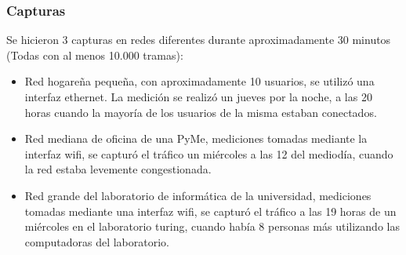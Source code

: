 \subsubsection*{Capturas}
Se hicieron 3 capturas en redes diferentes durante aproximadamente 30 minutos (Todas con al menos 10.000 tramas):
\begin{itemize}
	\item Red hogareña pequeña, con aproximadamente 10 usuarios, se utilizó una interfaz ethernet. La medición se realizó un jueves por la noche, a las 20 horas cuando la mayoría de los usuarios de la misma estaban conectados.
	\item Red mediana de oficina de una PyMe, mediciones tomadas mediante la interfaz wifi, se capturó el tráfico un miércoles a las 12 del mediodía, cuando la red estaba levemente congestionada.
	\item Red grande del laboratorio de informática de la universidad, mediciones tomadas mediante una interfaz wifi, se capturó el tráfico a las 19 horas de un miércoles en el laboratorio turing, cuando había 8 personas más utilizando las computadoras del laboratorio.
\end{itemize}
